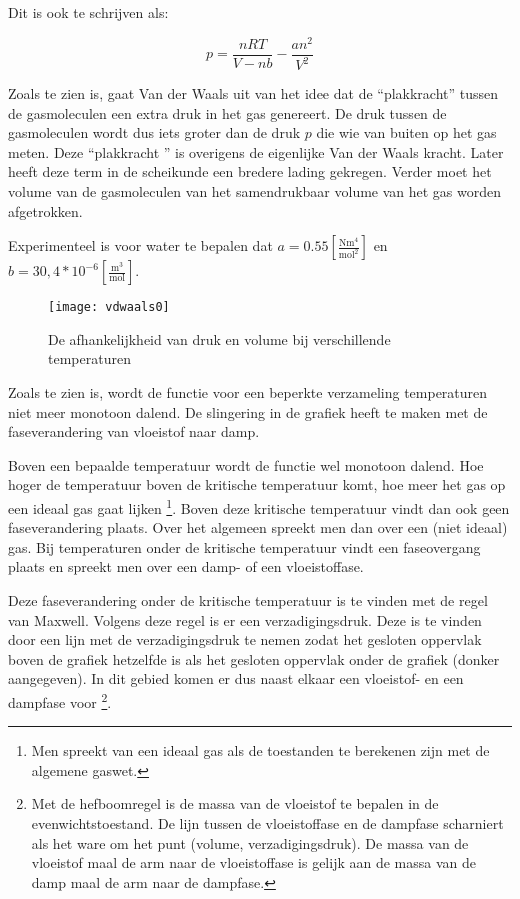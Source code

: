 Dit is ook te schrijven als:

\begin{equation}
p=\frac{nRT}{V-nb}-\frac{an^{2}}{V^{2}}
\end{equation}


Zoals te zien is, gaat Van der Waals uit van het idee dat de ``plakkracht''
tussen de gasmoleculen een extra druk in het gas genereert. De druk
tussen de gasmoleculen wordt dus iets groter dan de druk $p$ die
wie van buiten op het gas meten. Deze ``plakkracht '' is overigens
de eigenlijke Van der Waals kracht. Later heeft deze term in de scheikunde
een bredere lading gekregen. Verder moet het volume van de gasmoleculen
van het samendrukbaar volume van het gas worden afgetrokken.

Experimenteel is voor water te bepalen dat
$a=0.55[\frac{\mathrm{N}\mathrm{m}^{4}}{\mathrm{mo}\mathrm{l}^{2}}]$ en
$b=30,4*10^{-6}[\frac{\mathrm{m}^{3}}{\mathrm{mol}}]$. 

\begin{figure}[h]
\centering
\texttt{[image: vdwaals0]}

\caption{De afhankelijkheid van druk en volume bij verschillende temperaturen}
\end{figure}


Zoals te zien is, wordt de functie voor een beperkte verzameling temperaturen
niet meer monotoon dalend. De slingering in de grafiek heeft te maken
met de faseverandering van vloeistof naar damp. 

Boven een bepaalde temperatuur wordt de functie wel monotoon dalend. Hoe
hoger de temperatuur boven de kritische temperatuur komt, hoe meer het
gas op een ideaal gas gaat lijken \footnote{Men spreekt van een ideaal
gas als de toestanden te berekenen zijn met de algemene gaswet.}. Boven
deze kritische temperatuur vindt dan ook geen faseverandering plaats.
Over het algemeen spreekt men dan over een (niet ideaal) gas. Bij
temperaturen onder de kritische temperatuur vindt een faseovergang
plaats en spreekt men over een damp- of een vloeistoffase. 

Deze faseverandering onder de kritische temperatuur is te vinden met de
regel van Maxwell. Volgens deze regel is er een verzadigingsdruk. Deze
is te vinden door een lijn met de verzadigingsdruk te nemen zodat het
gesloten oppervlak boven de grafiek hetzelfde is als het gesloten
oppervlak onder de grafiek (donker aangegeven). In dit gebied komen er
dus naast elkaar een vloeistof- en een dampfase voor \footnote{Met de
hefboomregel is de massa van de vloeistof te bepalen in de
evenwichtstoestand. De lijn tussen de vloeistoffase en de dampfase
scharniert als het ware om het punt (volume, verzadigingsdruk). De massa
van de vloeistof maal de arm naar de vloeistoffase is gelijk aan de
massa van de damp maal de arm naar de dampfase.}. 

